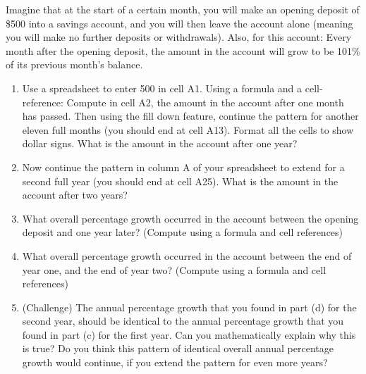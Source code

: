 \begin{stmt}
Imagine that at the start of a certain month, you will make an opening deposit of \$500 into a savings account, and you will then leave the account alone (meaning you will make no further deposits or withdrawals). Also, for this account: Every month after the opening deposit, the amount in the account will grow to be 101\% of its previous month's balance.
\begin{enumerate}[label=(\alph*), leftmargin=2em, topsep=2pt, itemsep=1pt]
\item Use a spreadsheet to enter 500 in cell A1. Using a formula and a cell-reference: Compute in cell A2, the amount in the account after one month has passed. Then using the fill down feature, continue the pattern for another eleven full months (you should end at cell A13). Format all the cells to show dollar signs. What is the amount in the account after one year?
\item Now continue the pattern in column A of your spreadsheet to extend for a second full year (you should end at cell A25). What is the amount in the account after two years?
\item What overall percentage growth occurred in the account between the opening deposit and one year later? (Compute using a formula and cell references)
\item What overall percentage growth occurred in the account between the end of year one, and the end of year two? (Compute using a formula and cell references)
\item (Challenge) The annual percentage growth that you found in part (d) for the second year, should be identical to the annual percentage growth that you found in part (c) for the first year. Can you mathematically explain why this is true? Do you think this pattern of identical overall annual percentage growth would continue, if you extend the pattern for even more years?
\end{enumerate}
\end{stmt}

